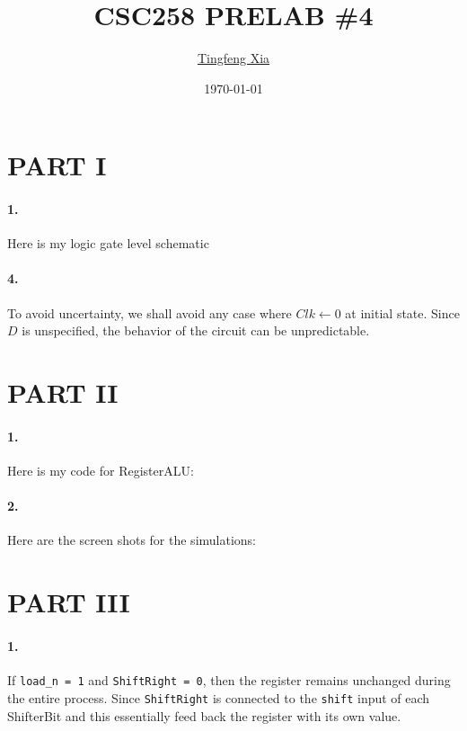 \documentclass[oneside, 10pt]{article}
\title{\LARGE CSC258 PRELAB \#4}
\author{\href{https://tingfengx.github.io}{Tingfeng Xia}}
\date{\today}
\begin{document}
\maketitle
\section*{PART I}
\paragraph{1.} Here is my logic gate level schematic
\begin{center}

\end{center}
\paragraph{4.} To avoid uncertainty, we shall avoid any case where $Clk\gets 0$ 
at initial state. Since $D$ is unspecified, the behavior of the circuit can be 
unpredictable. 

\section*{PART II}
\paragraph{1.} Here is my code for RegisterALU:

\paragraph{2.} Here are the screen shots for the simulations:

\section*{PART III}
\paragraph{1.} If \texttt{load\_n = 1} and \texttt{ShiftRight = 0}, then the 
register remains unchanged during the entire process. Since \texttt{ShiftRight}
is connected to the \texttt{shift} input of each ShifterBit and this essentially 
feed back the register with its own value. 
\end{document}
